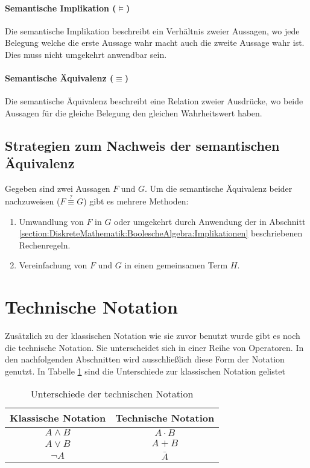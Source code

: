 \documentclass[../main.tex]{subfiles}
\begin{document}
        \paragraph{Semantische Implikation ($\models$)} Die semantische Implikation beschreibt ein Verhältnis zweier Aussagen, wo jede Belegung welche die erste Aussage wahr macht auch die zweite Aussage wahr ist. Dies muss nicht umgekehrt anwendbar sein.
        
        \paragraph{Semantische Äquivalenz ($\equiv$)} Die semantische Äquivalenz beschreibt eine Relation zweier Ausdrücke, wo beide Aussagen für die gleiche Belegung den gleichen Wahrheitswert haben.
        
        \subsection{Strategien zum Nachweis der semantischen Äquivalenz}
            Gegeben sind zwei Aussagen $F$ und $G$. Um die semantische Äquivalenz beider nachzuweisen ($F \stackrel{?}{\equiv} G$) gibt es mehrere Methoden:
            \begin{enumerate}
            	\item Umwandlung von $F$ in $G$ oder umgekehrt durch Anwendung der in Abschnitt \ref{section:DiskreteMathematik:BoolescheAlgebra:Implikationen} beschriebenen Rechenregeln.
            	\item Vereinfachung von $F$ und $G$ in einen gemeinsamen Term $H$.
            \end{enumerate}
                
    \section{Technische Notation}
        Zusätzlich zu der klassischen Notation wie sie zuvor benutzt wurde gibt es noch die technische Notation. Sie unterscheidet sich in einer Reihe von Operatoren. In den nachfolgenden Abschnitten wird ausschließlich diese Form der Notation genutzt. In Tabelle \ref{table:DiskreteMathematik:BoolscheAlgebra:TechnischeNotation} sind die Unterschiede zur klassischen Notation gelistet
        \begin{table}
            \centering
            \begin{tabular}{c c}
                Klassische Notation & Technische Notation\\
                \hline
                \noalign{\smallskip}
                $A \land B$ & $A \cdot B$ \\
                \noalign{\smallskip}
                $A \lor B$ & $A + B$ \\
                \noalign{\smallskip}
                $\lnot A$ & $\bar{A}$
            \end{tabular}
            \caption{Unterschiede der technischen Notation}
            \label{table:DiskreteMathematik:BoolscheAlgebra:TechnischeNotation}
        \end{table}
            
\end{document}
